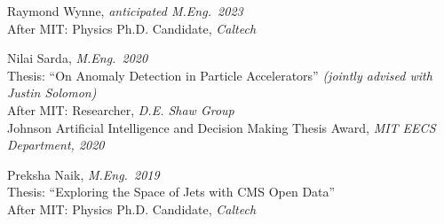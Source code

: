 \bbl

\item Raymond Wynne, \emph{anticipated M.Eng.~2023}
\\ After MIT: Physics Ph.D. Candidate, \emph{Caltech}

\item Nilai Sarda, \emph{M.Eng.~2020}
\\ Thesis: ``On Anomaly Detection in Particle Accelerators'' \emph{(jointly advised with Justin Solomon)}
\\ After MIT: Researcher, \emph{D.E. Shaw Group}
\\ Johnson Artificial Intelligence and Decision Making Thesis Award, \emph{MIT EECS Department, 2020}

\item Preksha Naik, \emph{M.Eng.~2019}
\\ Thesis: ``Exploring the Space of Jets with CMS Open Data''
\\ After MIT: Physics Ph.D. Candidate, \emph{Caltech}

\el

